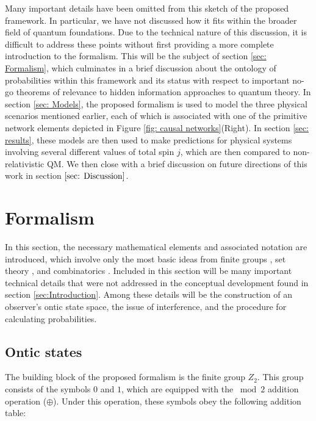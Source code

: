 \documentclass{article}
\begin{document}
Many important details have been omitted from this sketch of the proposed framework. In particular, we have not discussed how it fits within the broader field of quantum foundations. Due to the technical nature of this discussion, it is difficult to address these points without first providing a more complete introduction to the formalism. This will be the subject of section \ref{sec: Formalism}, which culminates in a brief discussion about the ontology of probabilities within this framework and its status with respect to important no-go theorems of relevance to hidden information approaches to quantum theory. In section \ref{sec: Models}, the proposed formalism is used to model the three physical scenarios mentioned earlier, each of which is associated with one of the primitive network elements depicted in Figure \ref{fig: causal networks}(Right). In section \ref{sec: results}, these models are then used to make predictions for physical systems involving several different values of total spin $j$, which are then compared to non-relativistic QM. We then close with a brief discussion on future directions of this work in section $\ref{sec: Discussion}$. 


\section{Formalism \label{sec: Formalism}}

In this section, the necessary mathematical elements and associated notation are introduced, which involve only the most basic ideas from finite groups \cite{Zee2016}, set theory \cite{Robinson2008}, and combinatorics \cite{Faticoni2014}. Included in this section will be many important technical details that were not addressed in the conceptual development found in section \ref{sec:Introduction}. Among these details will be the construction of an observer's ontic state space, the issue of interference, and the procedure for calculating probabilities. 

\subsection{Ontic states \label{sec: Ontic states}}

 The building block of the proposed formalism is the finite group $Z_2$. This group consists of the symbols $0$ and $1$, which are equipped with the $\bmod{2}$ addition operation ($\oplus$). Under this operation, these symbols obey the following addition table:
\end{document}
